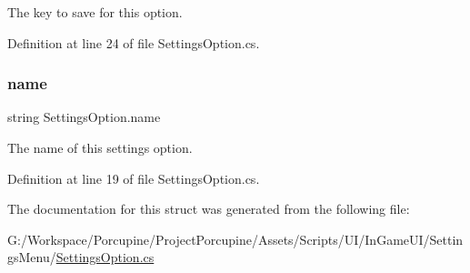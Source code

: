 The key to save for this option. 



Definition at line 24 of file Settings\+Option.\+cs.

\mbox{\label{struct_settings_option_a1be88b9055b5af9a446c79c9a3c83309}} 
\subsubsection{\texorpdfstring{name}{name}}
{\footnotesize\ttfamily string Settings\+Option.\+name}



The name of this settings option. 



Definition at line 19 of file Settings\+Option.\+cs.



The documentation for this struct was generated from the following file\+:\begin{DoxyCompactItemize}
\item 
G\+:/\+Workspace/\+Porcupine/\+Project\+Porcupine/\+Assets/\+Scripts/\+U\+I/\+In\+Game\+U\+I/\+Settings\+Menu/\hyperlink{_settings_option_8cs}{Settings\+Option.\+cs}\end{DoxyCompactItemize}
